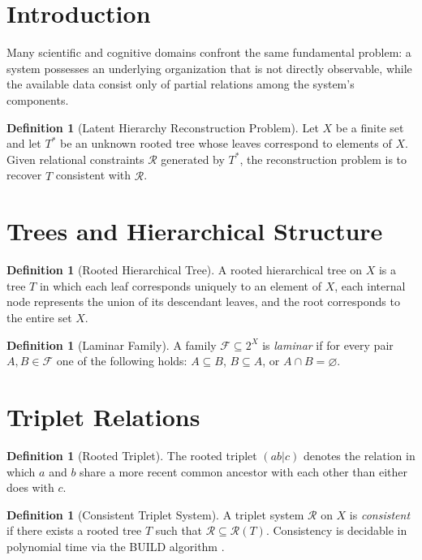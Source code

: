 \documentclass[12pt,a4paper,oneside]{book}
\numberwithin{equation}{chapter}
\theoremstyle{plain}
\theoremstyle{definition}
\newtheorem{definition}[theorem]{Definition}
\theoremstyle{remark}
\begin{document}
\section{Introduction}

Many scientific and cognitive domains confront the same fundamental
problem: a system possesses an underlying organization that is not
directly observable, while the available data consist only of partial
relations among the system's components.

\begin{definition}[Latent Hierarchy Reconstruction Problem]
Let $X$ be a finite set and let $T^\ast$ be an unknown rooted tree
whose leaves correspond to elements of $X$. Given relational
constraints $\mathcal{R}$ generated by $T^\ast$, the reconstruction
problem is to recover $\widehat{T}$ consistent with $\mathcal{R}$.
\end{definition}

\section{Trees and Hierarchical Structure}

\begin{definition}[Rooted Hierarchical Tree]
A rooted hierarchical tree on $X$ is a tree $T$ in which each leaf
corresponds uniquely to an element of $X$, each internal node
represents the union of its descendant leaves, and the root
corresponds to the entire set $X$.
\end{definition}

\begin{definition}[Laminar Family]
A family $\mathcal{F} \subseteq 2^X$ is \emph{laminar} if for every
pair $A,B \in \mathcal{F}$ one of the following holds:
$A \subseteq B$, $B \subseteq A$, or $A \cap B = \varnothing$.
\end{definition}

\section{Triplet Relations}

\begin{definition}[Rooted Triplet]
The rooted triplet $(ab|c)$ denotes the relation in which $a$ and $b$
share a more recent common ancestor with each other than either does
with $c$.
\end{definition}

\begin{definition}[Consistent Triplet System]
A triplet system $\mathcal{R}$ on $X$ is \emph{consistent} if there
exists a rooted tree $T$ such that $\mathcal{R} \subseteq
\mathcal{R}(T)$. Consistency is decidable in polynomial time via the
BUILD algorithm \cite{aho1981inferring}.
\end{definition}
\end{document}
